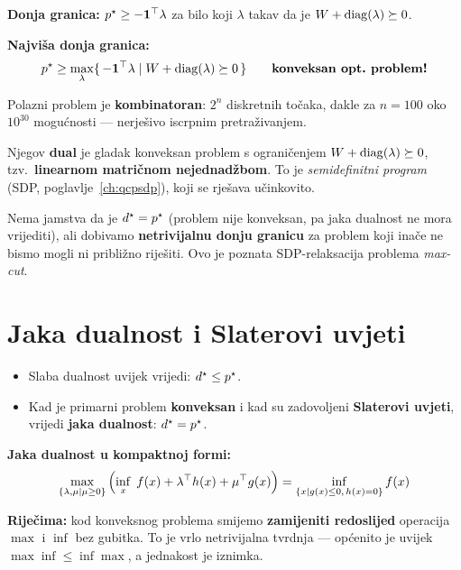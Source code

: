 \textbf{Donja granica:} $p^{\star} \ge -\mathbf{1}^{\top}\lambda$ za bilo koji $\lambda$
takav da je $W + \operatorname{diag}(\lambda) \succeq 0$.

\textbf{Najviša donja granica:}
\[
p^{\star} \ge \max_\lambda\{\, -\mathbf{1}^{\top}\lambda \mid
W + \operatorname{diag}(\lambda) \succeq 0 \,\}
\qquad \textbf{konveksan opt.\ problem!}
\]

\begin{napomena}
Polazni problem je \textbf{kombinatoran}: $2^n$ diskretnih točaka, dakle za
$n = 100$ oko $10^{30}$ mogućnosti --- nerješivo iscrpnim pretraživanjem.

Njegov \textbf{dual} je gladak konveksan problem s ograničenjem
$W + \operatorname{diag}(\lambda) \succeq 0$, tzv.\ \textbf{linearnom matričnom
nejednadžbom}. To je \emph{semidefinitni program} (SDP,
poglavlje~\ref{ch:qcpsdp}), koji se rješava učinkovito.

Nema jamstva da je $d^{\star} = p^{\star}$ (problem nije konveksan, pa jaka dualnost ne
mora vrijediti), ali dobivamo \textbf{netrivijalnu donju granicu} za problem
koji inače ne bismo mogli ni približno riješiti. Ovo je poznata SDP-relaksacija
problema \emph{max-cut}.
\end{napomena}

\section{Jaka dualnost i Slaterovi uvjeti}
\label{sec:jaka-dualnost}

\begin{teorem}
\begin{itemize}
  \item Slaba dualnost uvijek vrijedi: $d^{\star} \le p^{\star}$.
  \item Kad je primarni problem \textbf{konveksan} i kad su zadovoljeni
        \textbf{Slaterovi uvjeti}, vrijedi \textbf{jaka dualnost}:
        $d^{\star} = p^{\star}$.
\end{itemize}

\textbf{Jaka dualnost u kompaktnoj formi:}
\[
\max_{\{\lambda,\mu \mid \mu\ge0\}}
\left(\inf_x\; f(x) + \lambda^{\top} h(x) + \mu^{\top} g(x)\right)
= \inf_{\{x \mid g(x)\le0,\,h(x)=0\}} f(x)
\]
\end{teorem}

\textbf{Riječima:} kod konveksnog problema smijemo \textbf{zamijeniti redoslijed}
operacija $\max$ i $\inf$ bez gubitka. To je vrlo netrivijalna tvrdnja ---
općenito je uvijek $\max\inf \le \inf\max$, a jednakost je iznimka.

